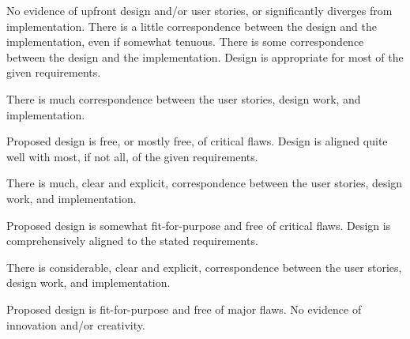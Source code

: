 \documentclass{../../fal_assignment}
\begin{document}
\begin{markingrubric}
%
        \grade\fail No evidence of upfront design and/or user stories, or significantly diverges from implementation.
        \grade There is a little correspondence between the design and the implementation, even if somewhat tenuous.
        \grade There is some correspondence between the design and the implementation.
        \grade Design is appropriate for most of the given requirements.
        \par     There is much correspondence between the user stories, design work, and implementation.
        \par     Proposed design is free, or mostly free, of critical flaws.
        \grade Design is aligned quite well with most, if not all, of the given requirements.
        \par     There is much, clear and explicit, correspondence between the user stories, design work, and implementation.
        \par     Proposed design is somewhat fit-for-purpose and free of critical flaws.
        \grade Design is comprehensively aligned to the stated requirements.
        \par     There is considerable, clear and explicit, correspondence between the user stories, design work, and implementation.
        \par     Proposed design is fit-for-purpose and free of major flaws.
%
        \grade\fail No evidence of innovation and/or creativity.

\end{markingrubric}
\end{document}
